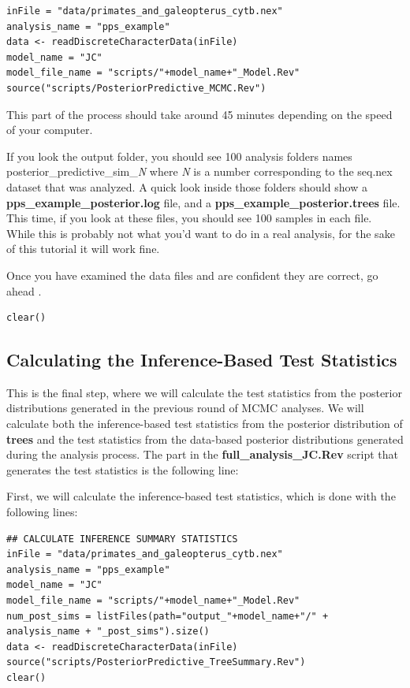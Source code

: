 {\tt \begin{Snugshade}[184,207,236]
\begin{lstlisting}
inFile = "data/primates_and_galeopterus_cytb.nex"
analysis_name = "pps_example"
data <- readDiscreteCharacterData(inFile)
model_name = "JC"
model_file_name = "scripts/"+model_name+"_Model.Rev"
source("scripts/PosteriorPredictive_MCMC.Rev")
\end{lstlisting}
\end{Snugshade}}

This part of the process should take around 45 minutes depending on the speed of your computer. 

If you look the output folder, you should see 100 analysis folders names posterior\_predictive\_sim\_\textit{N} 
where \textit{N} is a number corresponding to the seq.nex dataset that was analyzed. A quick look inside those 
folders should show a \textbf{pps\_example\_posterior.log} file, and a \textbf{pps\_example\_posterior.trees} 
file. This time, if you look at these files, you should see 100 samples in each file. While this is 
probably not what you'd want to do in a real analysis, for the sake of this tutorial it will work fine. 

Once you have examined the data files and are confident they are correct, go ahead  \RevBayes.

{\tt \begin{Snugshade}[184,207,236]
\begin{lstlisting}
clear()
\end{lstlisting}
\end{Snugshade}}

\subsection{Calculating the Inference-Based Test Statistics}
This is the final step, where we will calculate the test statistics from the posterior 
distributions generated in the previous round of MCMC analyses. We will calculate both the inference-based
test statistics from the posterior distribution of \textbf{trees} and the test statistics from the data-based 
posterior distributions generated during the analysis process. The part in the \textbf{full\_analysis\_JC.Rev} 
script that generates the test statistics is the following line:

First, we will calculate the inference-based test statistics, which is done with the following lines:

{\tt \begin{snugshade*}
\begin{lstlisting}
## CALCULATE INFERENCE SUMMARY STATISTICS
inFile = "data/primates_and_galeopterus_cytb.nex"
analysis_name = "pps_example"
model_name = "JC"
model_file_name = "scripts/"+model_name+"_Model.Rev"
num_post_sims = listFiles(path="output_"+model_name+"/" + analysis_name + "_post_sims").size()
data <- readDiscreteCharacterData(inFile)
source("scripts/PosteriorPredictive_TreeSummary.Rev")
clear()
\end{lstlisting}
\end{snugshade*}}

